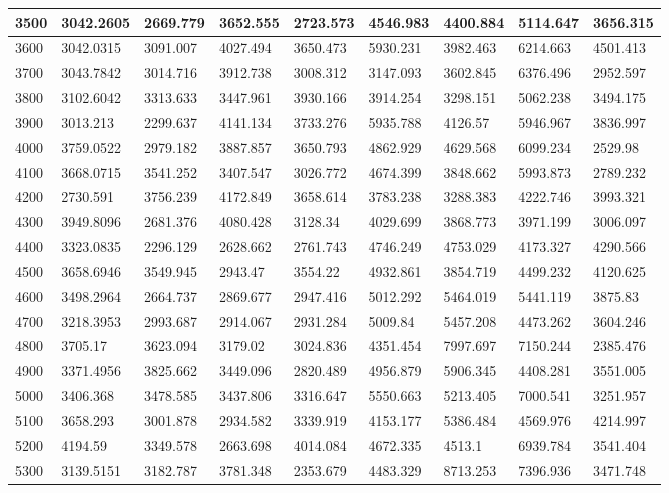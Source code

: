 \documentclass [11pt, proquest] {uwthesis}[2020/12/20]
\begin{document}
\begin{table}[]
\begin{tiny}
\begin{tabular}{|l|l|l|l|l|l|l|l|l|}
3500 & 3042.2605 & 2669.779 & 3652.555 & 2723.573 & 4546.983 & 4400.884 & 5114.647 & 3656.315 \\ \hline
3600 & 3042.0315 & 3091.007 & 4027.494 & 3650.473 & 5930.231 & 3982.463 & 6214.663 & 4501.413 \\ \hline
3700 & 3043.7842 & 3014.716 & 3912.738 & 3008.312 & 3147.093 & 3602.845 & 6376.496 & 2952.597 \\ \hline
3800 & 3102.6042 & 3313.633 & 3447.961 & 3930.166 & 3914.254 & 3298.151 & 5062.238 & 3494.175 \\ \hline
3900 & 3013.213 & 2299.637 & 4141.134 & 3733.276 & 5935.788 & 4126.57 & 5946.967 & 3836.997 \\ \hline
4000 & 3759.0522 & 2979.182 & 3887.857 & 3650.793 & 4862.929 & 4629.568 & 6099.234 & 2529.98 \\ \hline
4100 & 3668.0715 & 3541.252 & 3407.547 & 3026.772 & 4674.399 & 3848.662 & 5993.873 & 2789.232 \\ \hline
4200 & 2730.591 & 3756.239 & 4172.849 & 3658.614 & 3783.238 & 3288.383 & 4222.746 & 3993.321 \\ \hline
4300 & 3949.8096 & 2681.376 & 4080.428 & 3128.34 & 4029.699 & 3868.773 & 3971.199 & 3006.097 \\ \hline
4400 & 3323.0835 & 2296.129 & 2628.662 & 2761.743 & 4746.249 & 4753.029 & 4173.327 & 4290.566 \\ \hline
4500 & 3658.6946 & 3549.945 & 2943.47 & 3554.22 & 4932.861 & 3854.719 & 4499.232 & 4120.625 \\ \hline
4600 & 3498.2964 & 2664.737 & 2869.677 & 2947.416 & 5012.292 & 5464.019 & 5441.119 & 3875.83 \\ \hline
4700 & 3218.3953 & 2993.687 & 2914.067 & 2931.284 & 5009.84 & 5457.208 & 4473.262 & 3604.246 \\ \hline
4800 & 3705.17 & 3623.094 & 3179.02 & 3024.836 & 4351.454 & 7997.697 & 7150.244 & 2385.476 \\ \hline
4900 & 3371.4956 & 3825.662 & 3449.096 & 2820.489 & 4956.879 & 5906.345 & 4408.281 & 3551.005 \\ \hline
5000 & 3406.368 & 3478.585 & 3437.806 & 3316.647 & 5550.663 & 5213.405 & 7000.541 & 3251.957 \\ \hline
5100 & 3658.293 & 3001.878 & 2934.582 & 3339.919 & 4153.177 & 5386.484 & 4569.976 & 4214.997 \\ \hline
5200 & 4194.59 & 3349.578 & 2663.698 & 4014.084 & 4672.335 & 4513.1 & 6939.784 & 3541.404 \\ \hline
5300 & 3139.5151 & 3182.787 & 3781.348 & 2353.679 & 4483.329 & 8713.253 & 7396.936 & 3471.748 \\ \hline

\end{tabular}
\end{tiny}
\end{table}
\end{document}
